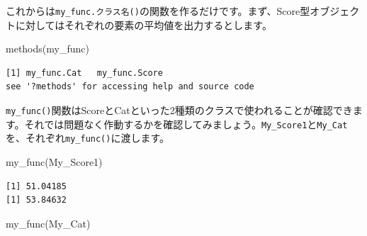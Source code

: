 \documentclass[
  a4paper,
  pandoc,
  ja=standard,
  jafont=haranoaji]{bxjsbook}
\newenvironment{Shaded}{\begin{snugshade}}{\end{snugshade}}
\newcommand{\ControlFlowTok}[1]{\textcolor[rgb]{0.00,0.48,0.65}{#1}}
\newcommand{\FunctionTok}[1]{\textcolor[rgb]{0.28,0.35,0.67}{#1}}
\newcommand{\NormalTok}[1]{\textcolor[rgb]{0.00,0.48,0.65}{#1}}
\newcommand{\OtherTok}[1]{\textcolor[rgb]{0.00,0.48,0.65}{#1}}
\newcommand{\SpecialCharTok}[1]{\textcolor[rgb]{0.37,0.37,0.37}{#1}}
\newcommand{\StringTok}[1]{\textcolor[rgb]{0.13,0.47,0.30}{#1}}
\begin{document}
これからは\texttt{my\_func.クラス名()}の関数を作るだけです。まず、Score型オブジェクトに対してはそれぞれの要素の平均値を出力するとします。

\begin{Shaded}
\end{Shaded}

\begin{Shaded}
\begin{Highlighting}[numbers=left,,]
\FunctionTok{methods}\NormalTok{(my\_func)}
\end{Highlighting}
\end{Shaded}

\begin{verbatim}
[1] my_func.Cat   my_func.Score
see '?methods' for accessing help and source code
\end{verbatim}

\texttt{my\_func()}関数はScoreとCatといった2種類のクラスで使われることが確認できます。それでは問題なく作動するかを確認してみましょう。\texttt{My\_Score1}と\texttt{My\_Cat}を、それぞれ\texttt{my\_func()}に渡します。

\begin{Shaded}
\begin{Highlighting}[numbers=left,,]
\FunctionTok{my\_func}\NormalTok{(My\_Score1)}
\end{Highlighting}
\end{Shaded}

\begin{verbatim}
[1] 51.04185
[1] 53.84632
\end{verbatim}

\begin{Shaded}
\begin{Highlighting}[numbers=left,,]
\FunctionTok{my\_func}\NormalTok{(My\_Cat)}
\end{Highlighting}
\end{Shaded}
\end{document}
